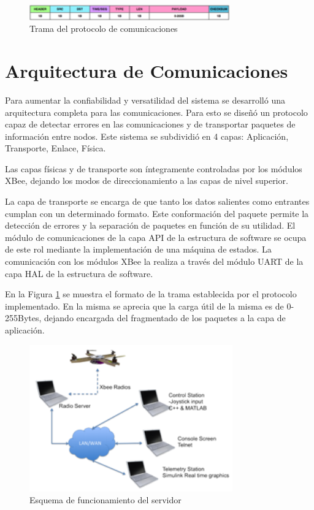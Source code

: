 \documentclass[a4paper, conference]{IEEEtran}
\begin{document}
\begin{figure}[!t]
\centering
\includegraphics[width=3.40in]{trama}
\caption{Trama del protocolo de comunicaciones}
\label{ref:trama}
\end{figure}

\section{Arquitectura de Comunicaciones}

Para aumentar la confiabilidad y versatilidad del sistema se desarrolló una arquitectura completa para las comunicaciones. Para esto se diseñó un protocolo capaz de detectar errores en las comunicaciones y de transportar paquetes de información entre nodos. Este sistema se subdividió en 4 capas: Aplicación, Transporte, Enlace, Física.

Las capas físicas y de transporte son íntegramente controladas por los módulos XBee, dejando los modos de direccionamiento a las capas de nivel superior.

La capa de transporte se encarga de que tanto los datos salientes como entrantes cumplan con un determinado formato. Este conformación del paquete permite la detección de errores y la separación de paquetes en función de su utilidad. El módulo de comunicaciones de la capa API de la estructura de software se ocupa de este rol mediante la implementación de una máquina de estados. La comunicación con los módulos XBee la realiza a través del módulo UART de la capa HAL de la estructura de software. 

En la Figura \ref{ref:trama} se muestra el formato de la trama establecida por el protocolo implementado. En la misma se aprecia que la carga útil de la misma es de 0-255Bytes, dejando encargada del fragmentado de los paquetes a la capa de aplicación.
 
 \begin{figure}[!t]
\centering
\includegraphics[width=3.45in]{server}
\caption{Esquema de funcionamiento del servidor}
\label{ref:server}
\end{figure}
\end{document}
